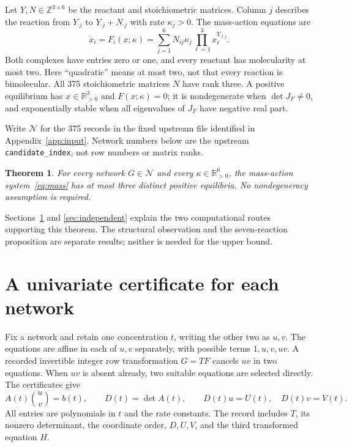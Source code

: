 \documentclass[11pt,a4paper]{article}
\newtheorem{theorem}{Theorem}
\newcommand{\Rp}{\mathbb R_{>0}}
\newcommand{\cN}{\mathcal N}
\begin{document}
Let $Y,N\in\mathbb Z^{3\times6}$ be the reactant and stoichiometric
matrices. Column $j$ describes the reaction from $Y_{\cdot j}$ to
$Y_{\cdot j}+N_{\cdot j}$ with rate $\kappa_j>0$. The mass-action
equations are
\begin{equation}\label{eq:mass}
 \dot x_i=F_i(x;\kappa)=\sum_{j=1}^6 N_{ij}\kappa_j
                  \prod_{\ell=1}^3 x_\ell^{Y_{\ell j}}.
\end{equation}
Both complexes have entries zero or one, and every reactant has
molecularity at most two. Here ``quadratic'' means at most two,
not that every reaction is bimolecular. All 375 stoichiometric
matrices $N$ have rank three. A positive equilibrium has $x\in\Rp^3$ and $F(x;\kappa)=0$;
it is nondegenerate when $\det J_F\ne0$, and exponentially stable
when all eigenvalues of $J_F$ have negative real part.

Write $\cN$ for the 375 records in the fixed upstream file identified
in Appendix~\ref{app:input}. Network numbers below are the upstream
\texttt{candidate\_index}, not row numbers or matrix ranks.

\begin{theorem}\label{thm:bound}
For every network $G\in\cN$ and every $\kappa\in\Rp^6$, the
mass-action system~\eqref{eq:mass} has at most three distinct
positive equilibria. No nondegeneracy assumption is required.
\end{theorem}

Sections~\ref{sec:cert} and \ref{sec:independent} explain the two
computational routes supporting this theorem. The structural
observation and the seven-reaction proposition are separate results;
neither is needed for the upper bound.

\section{A univariate certificate for each network}\label{sec:cert}
Fix a network and retain one concentration $t$, writing the other
two as $u,v$. The equations are affine in each of $u,v$ separately,
with possible terms $1,u,v,uv$. A recorded invertible integer row
transformation $G=TF$ cancels $uv$ in two equations. When $uv$ is
absent already, two suitable equations are selected directly.
The certificates give
\begin{equation}\label{eq:cramer}
 A(t)\binom{u}{v}=b(t),\qquad
 D(t)=\det A(t),\qquad
 D(t)u=U(t),\quad D(t)v=V(t).
\end{equation}
All entries are polynomials in $t$ and the rate constants. The
record includes $T$, its nonzero determinant, the coordinate order,
$D,U,V$, and the third transformed equation $H$.
\end{document}

